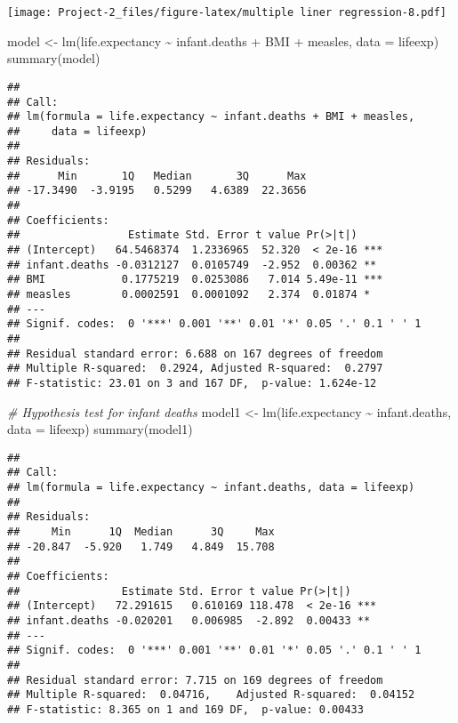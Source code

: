 \documentclass[
]{article}
\newenvironment{Shaded}{\begin{snugshade}}{\end{snugshade}}
\newcommand{\AttributeTok}[1]{\textcolor[rgb]{0.77,0.63,0.00}{#1}}
\newcommand{\CommentTok}[1]{\textcolor[rgb]{0.56,0.35,0.01}{\textit{#1}}}
\newcommand{\FunctionTok}[1]{\textcolor[rgb]{0.00,0.00,0.00}{#1}}
\newcommand{\NormalTok}[1]{#1}
\newcommand{\OtherTok}[1]{\textcolor[rgb]{0.56,0.35,0.01}{#1}}
\newcommand{\SpecialCharTok}[1]{\textcolor[rgb]{0.00,0.00,0.00}{#1}}
\begin{document}
\texttt{[image: Project-2\_files/figure-latex/multiple liner regression-8.pdf]}

\begin{Shaded}
\begin{Highlighting}[]
\NormalTok{model }\OtherTok{\textless{}{-}} \FunctionTok{lm}\NormalTok{(life.expectancy }\SpecialCharTok{\textasciitilde{}}\NormalTok{ infant.deaths }\SpecialCharTok{+}\NormalTok{ BMI }\SpecialCharTok{+}\NormalTok{ measles, }\AttributeTok{data =}\NormalTok{ lifeexp)}
\FunctionTok{summary}\NormalTok{(model)}
\end{Highlighting}
\end{Shaded}

\begin{verbatim}
## 
## Call:
## lm(formula = life.expectancy ~ infant.deaths + BMI + measles, 
##     data = lifeexp)
## 
## Residuals:
##      Min       1Q   Median       3Q      Max 
## -17.3490  -3.9195   0.5299   4.6389  22.3656 
## 
## Coefficients:
##                 Estimate Std. Error t value Pr(>|t|)    
## (Intercept)   64.5468374  1.2336965  52.320  < 2e-16 ***
## infant.deaths -0.0312127  0.0105749  -2.952  0.00362 ** 
## BMI            0.1775219  0.0253086   7.014 5.49e-11 ***
## measles        0.0002591  0.0001092   2.374  0.01874 *  
## ---
## Signif. codes:  0 '***' 0.001 '**' 0.01 '*' 0.05 '.' 0.1 ' ' 1
## 
## Residual standard error: 6.688 on 167 degrees of freedom
## Multiple R-squared:  0.2924, Adjusted R-squared:  0.2797 
## F-statistic: 23.01 on 3 and 167 DF,  p-value: 1.624e-12
\end{verbatim}

\begin{Shaded}
\begin{Highlighting}[]
\CommentTok{\# Hypothesis test for infant deaths}
\NormalTok{model1 }\OtherTok{\textless{}{-}} \FunctionTok{lm}\NormalTok{(life.expectancy }\SpecialCharTok{\textasciitilde{}}\NormalTok{ infant.deaths, }\AttributeTok{data =}\NormalTok{ lifeexp)}
\FunctionTok{summary}\NormalTok{(model1)}
\end{Highlighting}
\end{Shaded}

\begin{verbatim}
## 
## Call:
## lm(formula = life.expectancy ~ infant.deaths, data = lifeexp)
## 
## Residuals:
##     Min      1Q  Median      3Q     Max 
## -20.847  -5.920   1.749   4.849  15.708 
## 
## Coefficients:
##                Estimate Std. Error t value Pr(>|t|)    
## (Intercept)   72.291615   0.610169 118.478  < 2e-16 ***
## infant.deaths -0.020201   0.006985  -2.892  0.00433 ** 
## ---
## Signif. codes:  0 '***' 0.001 '**' 0.01 '*' 0.05 '.' 0.1 ' ' 1
## 
## Residual standard error: 7.715 on 169 degrees of freedom
## Multiple R-squared:  0.04716,    Adjusted R-squared:  0.04152 
## F-statistic: 8.365 on 1 and 169 DF,  p-value: 0.00433
\end{verbatim}
\end{document}
